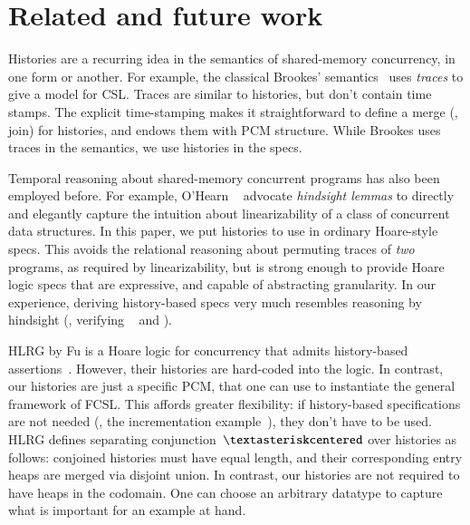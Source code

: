 \section{Related and future work}
\label{sec:related}
Histories are a recurring idea in the semantics of shared-memory
concurrency, in one form or another. For example, the classical
Brookes' semantics~\cite{Brookes:TCS07} uses \emph{traces} to give a
model for CSL.
%
%
Traces are similar to histories, but don't contain time stamps. The
explicit time-stamping makes it straightforward to define a merge
(\ie, join) for histories, and endows them with PCM structure. While
Brookes uses traces in the semantics, we use histories in the specs.


Temporal reasoning about shared-memory concurrent programs has also
been employed before. For example, O'Hearn
\etal~\cite{OHearn-al:PODC10} advocate \emph{hindsight lemmas} to
directly and elegantly capture the intuition about linearizability of
a class of concurrent data structures. In this paper, we put histories
to use in ordinary Hoare-style specs. This avoids the relational
reasoning about permuting traces of \emph{two} programs, as required
by linearizability, but is strong enough to provide Hoare logic specs
that are expressive, and capable of abstracting granularity. In our
experience, deriving history-based specs very much resembles reasoning
by hindsight (\eg, verifying ~\cite{OHearn-al:PODC10} and
).


HLRG by Fu \etal is a Hoare logic for concurrency that admits
history-based assertions~\cite{Fu-al:CONCUR10}. However, their
histories are hard-coded into the logic. In contrast, our histories
are just a specific PCM, that one can use to instantiate the general
framework of FCSL. This affords greater flexibility: if history-based
specifications are not needed (\eg, the incrementation
example~\cite{Nanevski-al:ESOP14}), they don't have to be used.  HLRG
defines separating conjunction~$\sep$ over histories as follows:
conjoined histories must have equal length, and their corresponding
entry heaps are merged via disjoint union.  In contrast, our histories
are not required to have heaps in the codomain. One can choose an
arbitrary datatype to capture what is important for an example at
hand.

